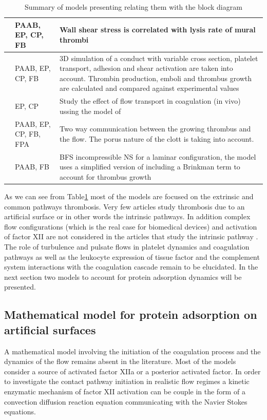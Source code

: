 \documentclass[%
 nofootinbib,
 amsmath,amssymb,
 aps,
 pra,
]{revtex4-1}
\begin{document}
\begin{table}[h]
\begin{tabular}{|p{5 cm} | p{3.5cm} | p{9.5 cm} |}
\hline
\citet{Wootton:2002} &  PAAB, EP, CP, FB & Wall shear stress is correlated with lysis rate of mural thrombi\\
\hline
\citet{Goodman:2005} & PAAB, EP, CP, FB & 3D simulation of a conduct with variable cross section, platelet transport, adhesion and shear activation are taken into account. Thrombin production, emboli and thrombus growth are calculated and compared against experimental values\\
\hline
\citet{Biasetti:2012} & EP, CP  & Study the effect of flow transport in coagulation (in vivo) ussing the model of \cite{Jones:1994}\\
\hline
\citet{Leiderman:2011} & PAAB, EP, CP, FB, FPA & Two way communication between the growing thrombus and the flow. The porus nature of the clott is taking into account.\\
\hline
\citet{Taylor:2015} & PAAB, FB & BFS incompressible NS for a laminar configuration, the model uses a simplified version of \citet{Fogelson:2004} including a Brinkman term to account for thrombus growth \\
\hline
\end{tabular}\caption{\label{tab:recap}Summary of models presenting relating them with the block diagram}
\end{table}
As we can see from Table\ref{tab:recap} most of the models are focused on the extrinsic and common pathways thrombosis. Very few articles study thrombosis due to an artificial surface or in other words the intrinsic pathways. In addition complex flow configurations (which is the real case for biomedical devices) and activation of factor XII are not considered in the articles that study the intrinsic pathway \citep{Gregory:1994,Zarnitsina:1996,Mandrusov:1998,Chatterjee:2010,Kogan:2001}.\\ The role of turbulence and pulsate flows in platelet dynamics and coagulation pathways as well as the leukocyte expression of tissue factor and the complement system interactions with the coagulation cascade remain to be elucidated. In the next section two models to account for protein adsorption dynamics will be presented.
\subsection{Mathematical model for protein adsorption on artificial surfaces}
A mathematical model involving the initiation of the coagulation process and the dynamics of the flow remains absent in the literature. Most of the models consider a source of activated factor XIIa or a posterior activated factor. In order to investigate the contact pathway initiation in realistic flow regimes a kinetic enzymatic mechanism of factor XII activation can be couple in the form of a convection diffusion reaction equation communicating with the Navier Stokes equations.\\
\end{document}
